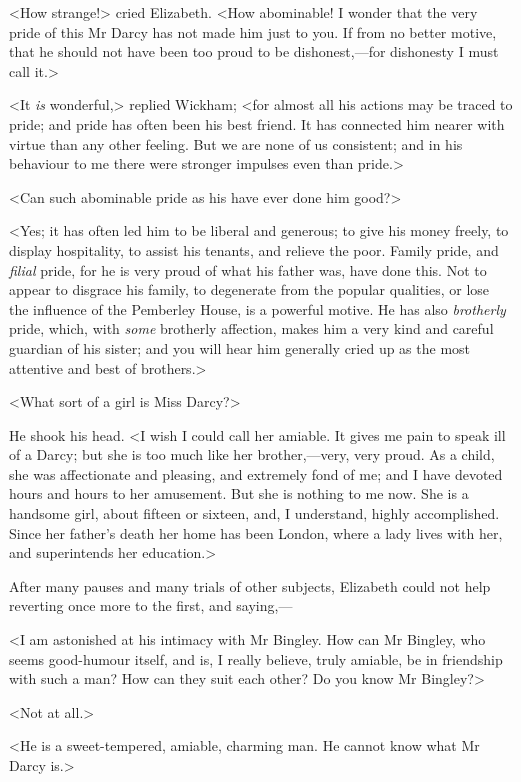 <How strange!> cried Elizabeth. <How abominable! I wonder that the very pride of this Mr Darcy has not made him just to you. If from no better motive, that he should not have been too proud to be dishonest,—for dishonesty I must call it.>

<It \textit{is} wonderful,> replied Wickham; <for almost all his actions may be traced to pride; and pride has often been his best friend. It has connected him nearer with virtue than any other feeling. But we are none of us consistent; and in his behaviour to me there were stronger impulses even than pride.>

<Can such abominable pride as his have ever done him good?>

<Yes; it has often led him to be liberal and generous; to give his money freely, to display hospitality, to assist his tenants, and relieve the poor. Family pride, and \textit{filial} pride, for he is very proud of what his father was, have done this. Not to appear to disgrace his family, to degenerate from the popular qualities, or lose the influence of the Pemberley House, is a powerful motive. He has also \textit{brotherly} pride, which, with \textit{some} brotherly affection, makes him a very kind and careful guardian of his sister; and you will hear him generally cried up as the most attentive and best of brothers.>

<What sort of a girl is Miss Darcy?>

He shook his head. <I wish I could call her amiable. It gives me pain to speak ill of a Darcy; but she is too much like her brother,—very, very proud. As a child, she was affectionate and pleasing, and extremely fond of me; and I have devoted hours and hours to her amusement. But she is nothing to me now. She is a handsome girl, about fifteen or sixteen, and, I understand, highly accomplished. Since her father's death her home has been London, where a lady lives with her, and superintends her education.>

After many pauses and many trials of other subjects, Elizabeth could not help reverting once more to the first, and saying,—

<I am astonished at his intimacy with Mr Bingley. How can Mr Bingley, who seems good-humour itself, and is, I really believe, truly amiable, be in friendship with such a man? How can they suit each other? Do you know Mr Bingley?>

<Not at all.>

<He is a sweet-tempered, amiable, charming man. He cannot know what Mr Darcy is.>

